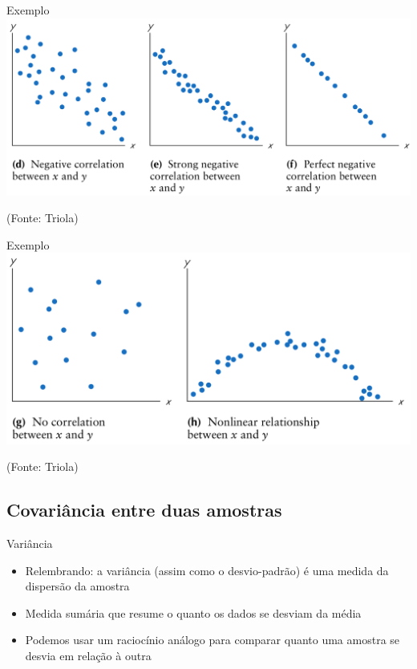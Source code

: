 \documentclass{beamer}
\begin{document}
\begin{frame}{Exemplo}
  \includegraphics[height=0.6\textheight]{negative}

  (Fonte: Triola)
\end{frame}

\begin{frame}{Exemplo}
  \includegraphics[height=0.6\textheight]{other}

  (Fonte: Triola)
\end{frame}



\subsection[Covariância]{Covariância entre duas amostras}

\begin{frame}{Variância}
  \begin{itemize}
  \item Relembrando: a variância (assim como o desvio-padrão) é uma
    medida da dispersão da amostra
  \item Medida sumária que resume o quanto os dados se desviam da
    média
  \item Podemos usar um raciocínio análogo para comparar quanto uma
    amostra se desvia em relação à outra
  \end{itemize}
\end{frame}
\end{document}
